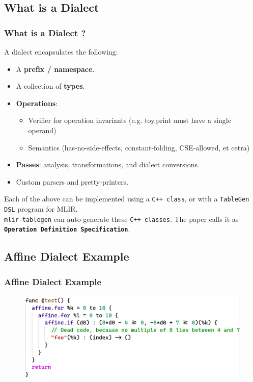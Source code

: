 \documentclass{beamer}
\begin{document}
\subsection{What is a Dialect}
\begin{frame}
  \frametitle{What is a Dialect ?}
  A dialect encapsulates the following: 
  \begin{itemize}
    \item A \textbf{prefix / namespace}.
    \item A collection of \textbf{types}.
    \item \textbf{Operations}:
      \begin{itemize}
        \item Verifier for operation invariants (e.g. toy.print must have a single operand)
        \item Semantics (has-no-side-effects, constant-folding, CSE-allowed, et cetra)
      \end{itemize}
    \item \textbf{Passes}: analysis, transformations, and dialect conversions.
    \item Custom parsers and pretty-printers.
  \end{itemize}
  \vspace{0.5cm}
  Each of the above can be implemented using a \texttt{C++ class}, or with a \texttt{TableGen DSL} program for MLIR. \\ 
  \vspace{0.5cm}
  \texttt{mlir-tablegen} can auto-generate these \texttt{C++ classes}. The paper calls it as \textbf{\texttt{Operation Definition Specification}}.
\end{frame}

\subsection{Affine Dialect Example}
\begin{frame}
  \frametitle{Affine Dialect Example}
  \begin{figure}[h]
    \centering    
    \includegraphics[width=\textwidth]{pictures/affine.png}
  \end{figure}
\end{frame}
\end{document}
